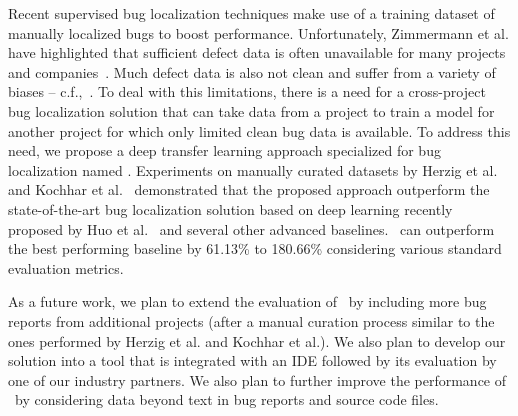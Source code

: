 Recent supervised bug localization techniques make use of a training dataset of manually localized bugs to boost performance. Unfortunately, Zimmermann et al. have highlighted that sufficient defect data is often unavailable for many projects and companies~\cite{ZimmermannNGGM09}. Much defect data is also not clean and suffer from a variety of biases -- c.f.,~\cite{HerzigJZ13,KochharTL14,BachmannBRDB10,BirdBADBFD09}. To deal with this limitations, there is a need for a cross-project bug localization solution that can take data from a project to train a model for another project for which only limited clean bug data is available. To address this need, we propose a deep transfer learning approach specialized for bug localization named \TRANPCNN.  Experiments on manually curated datasets by Herzig et al.~\cite{HerzigJZ13} and Kochhar et al.~\cite{KochharTL14} demonstrated that the proposed approach outperform the state-of-the-art bug localization solution based on deep learning recently proposed by Huo et al.~\cite{huo2016learning} and several other advanced baselines. \TRANPCNN\ can outperform the best performing baseline by 61.13\% to 180.66\% considering various standard evaluation metrics.

As a future work, we plan to extend the evaluation of \TRANPCNN\ by including more bug reports from additional projects (after a manual curation process similar to the ones performed by Herzig et al. and Kochhar et al.). We also plan to develop our solution into a tool that is integrated with an IDE followed by its evaluation by one of our industry partners. We also plan to further improve the performance of \TRANPCNN\ by considering data beyond text in bug reports and source code files. 

